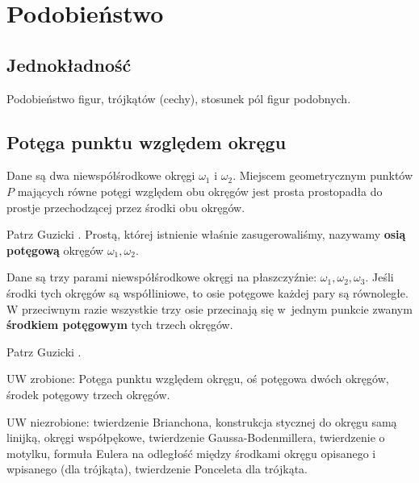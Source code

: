 %

\section{Podobieństwo}
\subsection{Jednokładność}
Podobieństwo figur, trójkątów (cechy), stosunek pól figur podobnych.







\subsection{Potęga punktu względem okręgu}

\begin{proposition}
\label{guzicki_6_11}%
    Dane są dwa niewspółśrodkowe okręgi $\omega_1$ i $\omega_2$.
    Miejscem geometrycznym punktów $P$ mających równe potęgi względem obu okręgów jest prosta prostopadła do prostje przechodzącej przez środki obu okręgów.
%
\end{proposition}

Patrz Guzicki \cite[s. 173, 174]{guzicki_2021}.
Prostą, której istnienie właśnie zasugerowaliśmy, nazywamy \textbf{osią potęgową} okręgów $\omega_1, \omega_2$.

\begin{corollary}
	Dane są trzy parami niewspółśrodkowe okręgi na płaszczyźnie: $\omega_1, \omega_2, \omega_3$.
	Jeśli środki tych okręgów są współliniowe, to osie potęgowe każdej pary są równoległe.
	W przeciwnym razie wszystkie trzy osie przecinają się w~jednym punkcie zwanym \textbf{środkiem potęgowym} tych trzech okręgów.
\end{corollary}

Patrz Guzicki \cite[s. 174]{guzicki_2021}.


UW zrobione:
Potęga punktu względem okręgu, oś potęgowa dwóch okręgów, środek potęgowy trzech okręgów.

UW niezrobione:
twierdzenie Brianchona, konstrukcja stycznej do okręgu samą linijką, okręgi współpękowe, twierdzenie Gaussa-Bodenmillera, twierdzenie o motylku, formuła Eulera na odległość między środkami okręgu opisanego i wpisanego (dla trójkąta), twierdzenie Ponceleta dla trójkąta.

